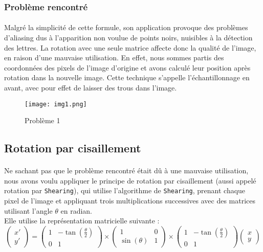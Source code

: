 \documentclass{article}
\begin{document}
\subsubsection{Problème rencontré}
\paragraph{}
Malgré la simplicité de cette formule, son application provoque des problèmes d'aliasing dus à l’apparition non voulue de points noirs, nuisibles à la détection des lettres. La rotation avec une seule matrice affecte donc la qualité de l’image, en raison d’une mauvaise utilisation. En effet, nous sommes partis des coordonnées des pixels de l'image d'origine et avons calculé leur position après rotation dans la nouvelle image. Cette technique s’appelle l'échantillonnage en avant, avec pour effet de laisser des trous dans l’image.
\begin{figure}[H]
    \centering
    \texttt{[image: img1.png]}
    \caption{Problème 1}
\end{figure}

\subsection{Rotation par cisaillement}
\paragraph{}
Ne sachant pas que le problème rencontré était dû à une mauvaise utilisation, nous avons voulu appliquer le principe de rotation par cisaillement (aussi appelé rotation par \texttt{Shearing}), qui utilise l’algorithme de \texttt{Shearing}, prenant chaque pixel de l’image et appliquant trois multiplications successives avec des matrices utilisant l’angle \(\theta\) en radian. \\
Elle utilise la représentation matricielle suivante :
$$
\left(\begin{array}{cc} x' \\ y' \end{array}\right) = \left(\begin{array}{cc}
   1  & -\tan(\frac{\theta}{2}) \\
    0 & 1 \end{array}\right) \times \left(\begin{array}{cc} 1 & 0 \\ \sin(\theta) & 1 \end{array}\right) \times \left(\begin{array}{cc} 1 & -\tan(\frac{\theta}{2}) \\ 0 & 1 \end{array}\right)
   \left(\begin{array}{cc} x \\ y \end{array}\right)
$$
\end{document}
